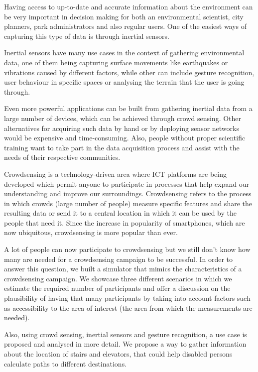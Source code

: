 
Having access to up-to-date and accurate information about the environment can 
be very important in decision making for both an environmental scientist, city planners, 
park administrators and also regular users. One of the easiest ways of capturing this type of data is through inertial sensors.

 Inertial sensors have many use cases in the context of gathering environmental data, one of them being capturing
surface movements like earthquakes or vibrations caused by different 
factors, while other can include gesture recognition, user behaviour
in specific spaces or analysing the terrain that the user is going through.

Even more powerful applications can be built from gathering inertial data from
a large number of devices, which can be achieved
 through crowd sensing. Other alternatives for acquiring such data by hand
or by deploying sensor networks would be expensive and time-consuming.
Also, people without proper scientific
training want to take part in the data acquisition process and assist
with the needs of their respective communities.


Crowdsensing is a
technology-driven area where ICT platforms are being developed
which permit anyone to participate in processes that help expand
our understanding and improve our surroundings. Crowdsensing
refers to the process in which crowds (large number of people)
measure specific features and share the resulting data or send it
to a central location in which it can be used by the people that
need it. Since the
increase in popularity of smartphones, which are now ubiquitous,
crowdsensing is more popular than ever.

A lot of people can now participate to crowdsensing but we still
don’t know how many are needed for a crowdsensing campaign
to be successful. In order to answer this question, we built a
simulator that mimics the characteristics of a crowdsensing campaign.
 We showcase three different scenarios in which we estimate
the required number of participants and offer a discussion on
the plausibility of having that many participants by taking into
account factors such as accessibility to the area of interest (the
area from which the measurements are needed).

Also, using crowd sensing, inertial sensors and gesture recognition, a use case is proposed and analysed in more
 detail. We propose a way to gather information about the location
 of stairs and elevators, that could help disabled
 persons calculate paths to different destinations.


